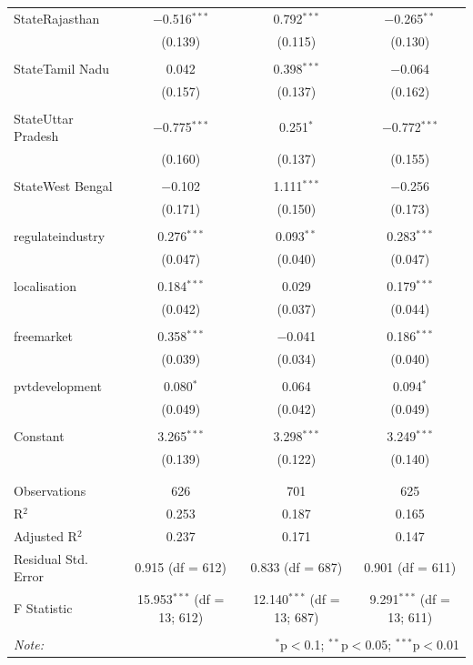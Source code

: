 \documentclass[
]{article}
\begin{document}
\begin{table}[!htbp]
\begin{tabular}{@{\extracolsep{5pt}}lccc}
 StateRajasthan & $-$0.516$^{***}$ & 0.792$^{***}$ & $-$0.265$^{**}$ \\ 
  & (0.139) & (0.115) & (0.130) \\ 
  & & & \\ 
 StateTamil Nadu & 0.042 & 0.398$^{***}$ & $-$0.064 \\ 
  & (0.157) & (0.137) & (0.162) \\ 
  & & & \\ 
 StateUttar Pradesh & $-$0.775$^{***}$ & 0.251$^{*}$ & $-$0.772$^{***}$ \\ 
  & (0.160) & (0.137) & (0.155) \\ 
  & & & \\ 
 StateWest Bengal & $-$0.102 & 1.111$^{***}$ & $-$0.256 \\ 
  & (0.171) & (0.150) & (0.173) \\ 
  & & & \\ 
 regulateindustry & 0.276$^{***}$ & 0.093$^{**}$ & 0.283$^{***}$ \\ 
  & (0.047) & (0.040) & (0.047) \\ 
  & & & \\ 
 localisation & 0.184$^{***}$ & 0.029 & 0.179$^{***}$ \\ 
  & (0.042) & (0.037) & (0.044) \\ 
  & & & \\ 
 freemarket & 0.358$^{***}$ & $-$0.041 & 0.186$^{***}$ \\ 
  & (0.039) & (0.034) & (0.040) \\ 
  & & & \\ 
 pvtdevelopment & 0.080$^{*}$ & 0.064 & 0.094$^{*}$ \\ 
  & (0.049) & (0.042) & (0.049) \\ 
  & & & \\ 
 Constant & 3.265$^{***}$ & 3.298$^{***}$ & 3.249$^{***}$ \\ 
  & (0.139) & (0.122) & (0.140) \\ 
  & & & \\ 
\hline \\[-1.8ex] 
Observations & 626 & 701 & 625 \\ 
R$^{2}$ & 0.253 & 0.187 & 0.165 \\ 
Adjusted R$^{2}$ & 0.237 & 0.171 & 0.147 \\ 
Residual Std. Error & 0.915 (df = 612) & 0.833 (df = 687) & 0.901 (df = 611) \\ 
F Statistic & 15.953$^{***}$ (df = 13; 612) & 12.140$^{***}$ (df = 13; 687) & 9.291$^{***}$ (df = 13; 611) \\ 
\hline 
\hline \\[-1.8ex] 
\textit{Note:}  & \multicolumn{3}{r}{$^{*}$p$<$0.1; $^{**}$p$<$0.05; $^{***}$p$<$0.01} \\ 
\end{tabular} 
\end{table} 
\endgroup
\end{document}
